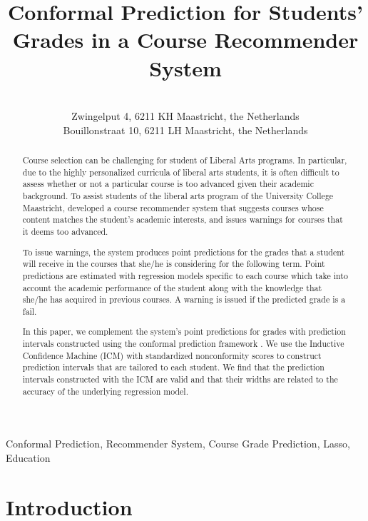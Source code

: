 \documentclass[pmlr]{jmlr}%
\title[Conformal Prediction for Students' Grades]{Conformal Prediction for Students' Grades in a Course Recommender System}	%
\author{\Name{Rapha\"{e}l Morsomme} \Email{raphael.morsomme@maastrichtuniversity.nl}\\ %
   \addr Zwingelput 4, 6211 KH Maastricht, the Netherlands	
   \AND
   \Name{Evgueni Smirnov} \Email{smirnov@maastrichtuniversity.nl}\\
   \addr Bouillonstraat 10, 6211 LH Maastricht, the Netherlands}
\newcommand\todo[1]{\textcolor{red}{#1}}
\begin{document}
\maketitle

\begin{abstract}
Course selection can be challenging for student of Liberal Arts programs. In particular, due to the highly personalized curricula of liberal arts students, it is often difficult to assess whether or not a particular course is too advanced given their academic background. To assist students of the liberal arts program of the University College Maastricht, \citet{Morsomme.2019} developed a course recommender system that suggests courses whose content matches the student's academic interests, and issues warnings for courses that it deems too advanced.

To issue warnings, the system produces point predictions for the grades that a student will receive in the courses that she/he is considering for the following term. Point predictions are estimated with regression models specific to each course which take into account the academic performance of the student along with the knowledge that she/he has acquired in previous courses. A warning is issued if the predicted grade is a fail.

In this paper, we complement the system's point predictions for grades with prediction intervals constructed using the conformal prediction framework \citep{Vovk.2005}. We use the Inductive Confidence Machine (ICM) \citep{Papadopoulos.2002} with standardized nonconformity scores to construct prediction intervals that are tailored to each student. We find that the prediction intervals constructed with the ICM are valid and that their widths are related to the accuracy of the underlying regression model.
\end{abstract}

\begin{keywords} Conformal Prediction, Recommender System, Course Grade Prediction, Lasso, Education \end{keywords}




\section{Introduction}
\label{sec:intro}
\end{document}
